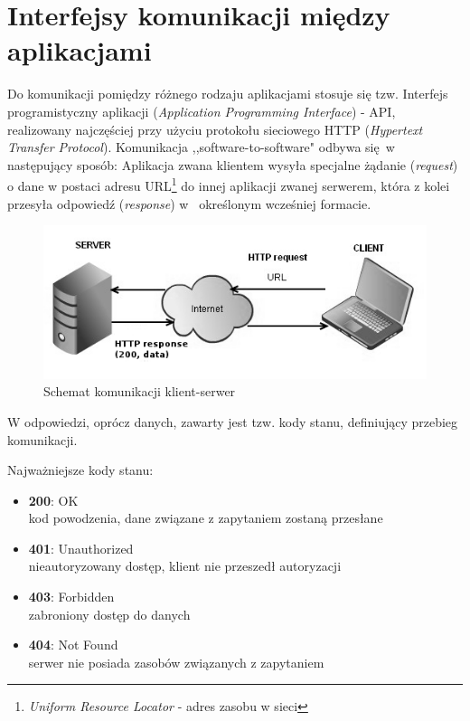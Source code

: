 \section{Interfejsy komunikacji między aplikacjami}
Do komunikacji pomiędzy różnego rodzaju aplikacjami stosuje się tzw. Interfejs programistyczny aplikacji (\emph{Application Programming Interface}) - API, realizowany najczęściej przy użyciu protokołu sieciowego HTTP (\emph{Hypertext Transfer Protocol}).
Komunikacja ,,software-to-software" odbywa się w następujący sposób:
Aplikacja zwana klientem wysyła specjalne żądanie (\emph{request}) o dane w postaci adresu URL\footnote{\emph{Uniform Resource Locator} - adres zasobu w sieci} do innej aplikacji zwanej serwerem, która z kolei przesyła odpowiedź (\emph{response}) w~ określonym wcześniej formacie.

\begin{figure}[h]
  \centering
  \includegraphics[scale=0.87]{images/http_communication.png}
  \caption{Schemat komunikacji klient-serwer}
\end{figure}

W odpowiedzi, oprócz danych, zawarty jest tzw. kody stanu, definiujący przebieg komunikacji.

Najważniejsze kody stanu:
 \begin{itemize}
     \item \textbf {200}: OK \\
     kod powodzenia, dane związane z zapytaniem zostaną przesłane
     \item \textbf {401}: Unauthorized \\
     nieautoryzowany dostęp, klient nie przeszedł autoryzacji
     \item \textbf {403}: Forbidden \\
     zabroniony dostęp do danych
     \item \textbf {404}: Not Found \\
     serwer nie posiada zasobów związanych z zapytaniem
  \end{itemize}


